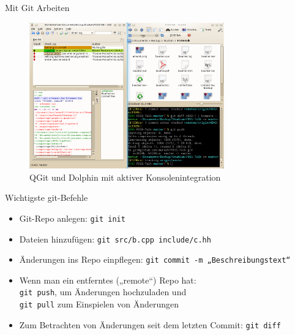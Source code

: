 \begin{frame}{Mit Git Arbeiten}
  \begin{figure}
    \includegraphics[keepaspectratio=true,width=0.75\textwidth]{qgit_dolphin}
    \caption{QGit und Dolphin mit aktiver Konsolenintegration}
  \end{figure}  
\end{frame}

\begin{frame}{Wichtigste git-Befehle}
  \begin{itemize}
    \item Git-Repo anlegen: \texttt{git init}
    \item Dateien hinzufügen: \texttt{git src/b.cpp include/c.hh}
    \item Änderungen ins Repo einpflegen: \texttt{git commit -m „Beschreibungstext“}
    \item Wenn man ein entferntes („remote“) Repo hat:\\
      \texttt{git push}, um Änderungen hochzuladen und\\
      \texttt{git pull} zum Einspielen von Änderungen
    \item Zum Betrachten von Änderungen seit dem letzten Commit: \texttt{git diff}
  \end{itemize}
\end{frame}

